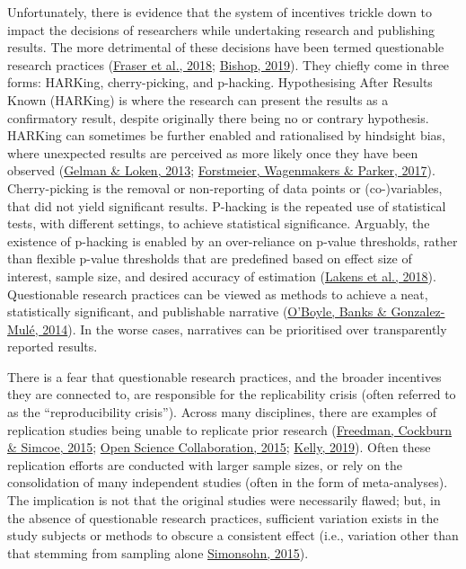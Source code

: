 \documentclass[10pt,a4paper]{article}
\begin{document}
Unfortunately, there is evidence that the system of incentives trickle down to impact the decisions of researchers while undertaking research and publishing results.
The more detrimental of these decisions have been termed questionable research practices (\protect\hyperlink{ref-fraser_questionable_2018}{Fraser et al., 2018}; \protect\hyperlink{ref-bishop_rein_2019}{Bishop, 2019}).
They chiefly come in three forms: HARKing, cherry-picking, and p-hacking.
Hypothesising After Results Known (HARKing) is where the research can present the results as a confirmatory result, despite originally there being no or contrary hypothesis.
HARKing can sometimes be further enabled and rationalised by hindsight bias, where unexpected results are perceived as more likely once they have been observed (\protect\hyperlink{ref-gelman_garden_2013}{Gelman \& Loken, 2013}; \protect\hyperlink{ref-forstmeier_detecting_2017}{Forstmeier, Wagenmakers \& Parker, 2017}).
Cherry-picking is the removal or non-reporting of data points or (co-)variables, that did not yield significant results.
P-hacking is the repeated use of statistical tests, with different settings, to achieve statistical significance.
Arguably, the existence of p-hacking is enabled by an over-reliance on p-value thresholds, rather than flexible p-value thresholds that are predefined based on effect size of interest, sample size, and desired accuracy of estimation (\protect\hyperlink{ref-lakens_justify_2018}{Lakens et al., 2018}).
Questionable research practices can be viewed as methods to achieve a neat, statistically significant, and publishable narrative (\protect\hyperlink{ref-oboyle_chrysalis_2014}{O'Boyle, Banks \& Gonzalez-Mulé, 2014}).
In the worse cases, narratives can be prioritised over transparently reported results.

There is a fear that questionable research practices, and the broader incentives they are connected to, are responsible for the replicability crisis (often referred to as the ``reproducibility crisis''). Across many disciplines, there are examples of replication studies being unable to replicate prior research (\protect\hyperlink{ref-freedman_economics_2015}{Freedman, Cockburn \& Simcoe, 2015}; \protect\hyperlink{ref-open_science_collaboration_estimating_2015}{Open Science Collaboration, 2015}; \protect\hyperlink{ref-kelly_rate_2019}{Kelly, 2019}).
Often these replication efforts are conducted with larger sample sizes, or rely on the consolidation of many independent studies (often in the form of meta-analyses).
The implication is not that the original studies were necessarily flawed; but, in the absence of questionable research practices, sufficient variation exists in the study subjects or methods to obscure a consistent effect (i.e., variation other than that stemming from sampling alone \protect\hyperlink{ref-simonsohn_small_2015}{Simonsohn, 2015}).
\end{document}
